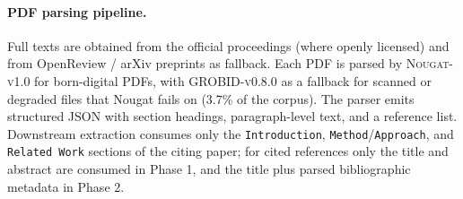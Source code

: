 \documentclass{llmxive}
\begin{document}

\paragraph{PDF parsing pipeline.}
Full texts are obtained from the official proceedings (where openly licensed) and from OpenReview / arXiv
preprints as fallback. Each PDF is parsed by \textsc{Nougat-v1.0} for born-digital PDFs, with
\textsc{GROBID-v0.8.0} as a fallback for scanned or degraded files that Nougat fails on (3.7\% of the corpus). The
parser emits structured JSON with section headings, paragraph-level text, and a reference list. Downstream
extraction consumes only the \texttt{Introduction}, \texttt{Method}/\texttt{Approach}, and \texttt{Related Work}
sections of the citing paper; for cited references only the title and abstract are consumed in Phase 1, and the
title plus parsed bibliographic metadata in Phase 2.
\end{document}
